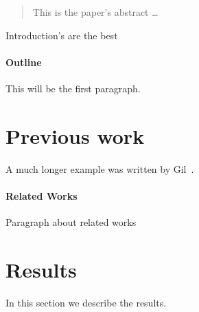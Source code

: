 \documentclass[12pt]{article}
\begin{document}
\maketitle

\begin{abstract}
This is the paper's abstract \ldots
\end{abstract}

\Introduction
Introduction's are the best

\paragraph{Outline}
This will be the first paragraph.

\section{Previous work}\label{previous work}
A much longer \LaTeXe{} example was written by Gil~\cite{Gil:02}.

\paragraph{Related Works}
Paragraph about related works

\section{Results}\label{results}
In this section we describe the results.



\end{document}
